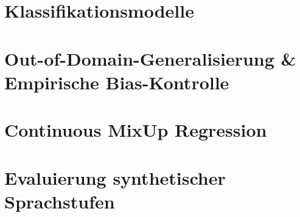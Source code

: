 \section{Klassifikationsmodelle}

\section{Out-of-Domain-Generalisierung \& Empirische Bias-Kontrolle}

\section{Continuous MixUp Regression}

\section{Evaluierung synthetischer Sprachstufen}
